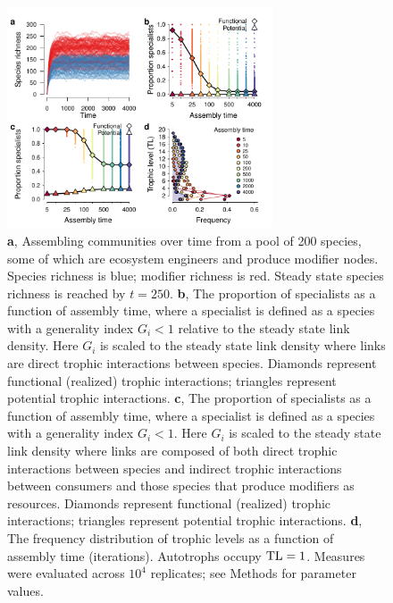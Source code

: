 \documentclass[onecolumn,preprintnumbers,amsmath,amssymb,superscriptaddress]{revtex4-1}
\begin{document}
\begin{bibunit}
\begin{figure}[h!]
\centering
\includegraphics[width=0.7\textwidth]{fig_trophic3_eng.pdf}
\caption{
\textbf{a}, Assembling communities over time from a pool of 200 species, some of which are ecosystem engineers and produce modifier nodes. 
Species richness is blue; modifier richness is red.
Steady state species richness is reached by $t=250$.
\textbf{b}, The proportion of specialists as a function of assembly time, where a specialist is defined as a species with a generality index $G_i < 1$ relative to the steady state link density.
Here $G_i$ is scaled to the steady state link density where links are direct trophic interactions between species.
Diamonds represent functional (realized) trophic interactions; triangles represent potential trophic interactions.
\textbf{c}, The proportion of specialists as a function of assembly time, where a specialist is defined as a species with a generality index $G_i < 1$.
Here $G_i$ is scaled to the steady state link density where links are composed of both direct trophic interactions between species and indirect trophic interactions between consumers and those species that produce modifiers as resources.
Diamonds represent functional (realized) trophic interactions; triangles represent potential trophic interactions.
\textbf{d}, The frequency distribution of trophic levels as a function of assembly time (iterations). 
Autotrophs occupy ${\rm TL}=1$.
Measures were evaluated across $10^4$ replicates; see Methods for parameter values.
}
\label{fig:trophiceng}
\end{figure}



\end{bibunit}
\end{document}

